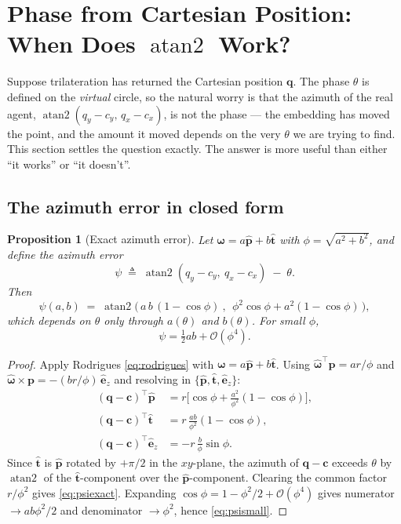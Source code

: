 \documentclass[11pt,a4paper]{article}
\newtheorem{proposition}{Proposition}
\newcommand{\ez}{\hat{\bm{e}}_z}
\newcommand{\q}{\bm{q}}
\newcommand{\pv}{\bm{p}}
\newcommand{\cv}{\bm{c}}
\newcommand{\phat}{\hat{\bm{p}}}
\newcommand{\that}{\hat{\bm{t}}}
\begin{document}
\section{Phase from Cartesian Position: When Does \texorpdfstring{$\operatorname{atan2}$}{atan2} Work?}
\label{sec:azimuth}

Suppose trilateration has returned the Cartesian position $\q$. The phase
$\theta$ is defined on the \emph{virtual} circle, so the natural worry is that
the azimuth of the real agent, $\operatorname{atan2}(q_y-c_y,\,q_x-c_x)$, is not
the phase --- the embedding has moved the point, and the amount it moved depends
on the very $\theta$ we are trying to find. This section settles the question
exactly. The answer is more useful than either ``it works'' or ``it doesn't''.

\subsection{The azimuth error in closed form}

\begin{proposition}[Exact azimuth error]
\label{prop:azimuth}
Let $\bm\omega = a\phat + b\that$ with $\phi=\sqrt{a^2+b^2}$, and define the
azimuth error
\begin{equation}
\psi \;\triangleq\; \operatorname{atan2}(q_y - c_y,\ q_x - c_x) \;-\; \theta .
\end{equation}
Then
\begin{equation}
\boxed{\;
\psi(a,b) \;=\; \operatorname{atan2}\!\Big(\,
a\,b\,(1-\cos\phi)\ ,\ \
\phi^2\cos\phi + a^2(1-\cos\phi)\,\Big),
\;}
\label{eq:psiexact}
\end{equation}
which depends on $\theta$ only through $a(\theta)$ and $b(\theta)$. For small
$\phi$,
\begin{equation}
\psi = \tfrac{1}{2}ab + \mathcal{O}(\phi^4).
\label{eq:psismall}
\end{equation}
\end{proposition}
\begin{proof}
Apply Rodrigues \eqref{eq:rodrigues} with $\bm\omega=a\phat+b\that$. Using
$\hat{\bm\omega}^\top\pv = ar/\phi$ and
$\hat{\bm\omega}\times\pv = -(br/\phi)\,\ez$ and resolving in
$\{\phat,\that,\ez\}$:
\begin{align}
(\q-\cv)^\top\phat &= r\Big[\cos\phi + \tfrac{a^2}{\phi^2}(1-\cos\phi)\Big], \\
(\q-\cv)^\top\that &= r\,\tfrac{ab}{\phi^2}(1-\cos\phi), \\
(\q-\cv)^\top\ez   &= -r\,\tfrac{b}{\phi}\sin\phi .
\label{eq:components}
\end{align}
Since $\that$ is $\phat$ rotated by $+\pi/2$ in the $xy$-plane, the azimuth of
$\q-\cv$ exceeds $\theta$ by $\operatorname{atan2}$ of the $\that$-component
over the $\phat$-component. Clearing the common factor $r/\phi^2$ gives
\eqref{eq:psiexact}. Expanding $\cos\phi = 1-\phi^2/2+\mathcal{O}(\phi^4)$ gives
numerator $\to ab\phi^2/2$ and denominator $\to \phi^2$, hence
\eqref{eq:psismall}.
\end{proof}
\end{document}
